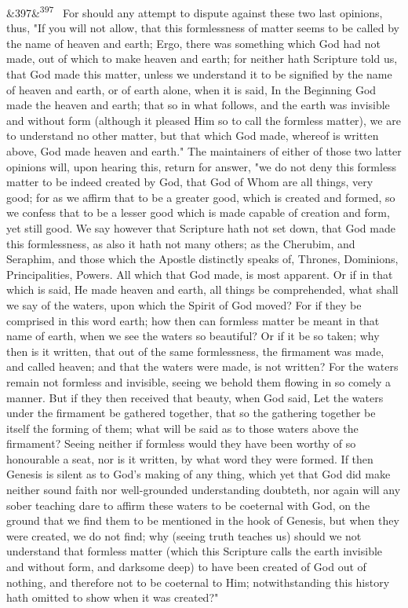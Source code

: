 \documentclass[12pt]{article}
\newcommand{\para}[1][]{\par\noindent\ifx&#1&\else\textsuperscript{\footnotesize #1}~\fi}
\begin{document}
\para[397] For should any attempt to dispute against these two last opinions, thus, "If you will not allow, that this formlessness of matter seems to be called by the name of heaven and earth; Ergo, there was something which God had not made, out of which to make heaven and earth; for neither hath Scripture told us, that God made this matter, unless we understand it to be signified by the name of heaven and earth, or of earth alone, when it is said, In the Beginning God made the heaven and earth; that so in what follows, and the earth was invisible and without form (although it pleased Him so to call the formless matter), we are to understand no other matter, but that which God made, whereof is written above, God made heaven and earth." The maintainers of either of those two latter opinions will, upon hearing this, return for answer, "we do not deny this formless matter to be indeed created by God, that God of Whom are all things, very good; for as we affirm that to be a greater good, which is created and formed, so we confess that to be a lesser good which is made capable of creation and form, yet still good. We say however that Scripture hath not set down, that God made this formlessness, as also it hath not many others; as the Cherubim, and Seraphim, and those which the Apostle distinctly speaks of, Thrones, Dominions, Principalities, Powers. All which that God made, is most apparent. Or if in that which is said, He made heaven and earth, all things be comprehended, what shall we say of the waters, upon which the Spirit of God moved? For if they be comprised in this word earth; how then can formless matter be meant in that name of earth, when we see the waters so beautiful? Or if it be so taken; why then is it written, that out of the same formlessness, the firmament was made, and called heaven; and that the waters were made, is not written? For the waters remain not formless and invisible, seeing we behold them flowing in so comely a manner. But if they then received that beauty, when God said, Let the waters under the firmament be gathered together, that so the gathering together be itself the forming of them; what will be said as to those waters above the firmament? Seeing neither if formless would they have been worthy of so honourable a seat, nor is it written, by what word they were formed. If then Genesis is silent as to God's making of any thing, which yet that God did make neither sound faith nor well-grounded understanding doubteth, nor again will any sober teaching dare to affirm these waters to be coeternal with God, on the ground that we find them to be mentioned in the hook of Genesis, but when they were created, we do not find; why (seeing truth teaches us) should we not understand that formless matter (which this Scripture calls the earth invisible and without form, and darksome deep) to have been created of God out of nothing, and therefore not to be coeternal to Him; notwithstanding this history hath omitted to show when it was created?"
\end{document}
